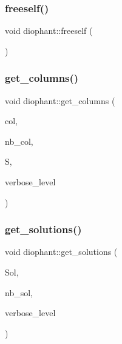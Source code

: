 \mbox{\label{classdiophant_a824e8dadc8420254d9e91f54e7e0ff5d}} 
\subsubsection{\texorpdfstring{freeself()}{freeself()}}
{\footnotesize\ttfamily void diophant\+::freeself (\begin{DoxyParamCaption}{ }\end{DoxyParamCaption})}

\mbox{\label{classdiophant_a394c08d30cf6df92f3d79ef52d0cff08}} 
\subsubsection{\texorpdfstring{get\+\_\+columns()}{get\_columns()}}
{\footnotesize\ttfamily void diophant\+::get\+\_\+columns (\begin{DoxyParamCaption}\item[{\mbox{\hyperlink{galois_8h_a09fddde158a3a20bd2dcadb609de11dc}{I\+NT}} $\ast$}]{col,  }\item[{\mbox{\hyperlink{galois_8h_a09fddde158a3a20bd2dcadb609de11dc}{I\+NT}}}]{nb\+\_\+col,  }\item[{\mbox{\hyperlink{classset__of__sets}{set\+\_\+of\+\_\+sets}} $\ast$\&}]{S,  }\item[{\mbox{\hyperlink{galois_8h_a09fddde158a3a20bd2dcadb609de11dc}{I\+NT}}}]{verbose\+\_\+level }\end{DoxyParamCaption})}

\mbox{\label{classdiophant_a3a77d2ec2f596cbca5677dda567ca34b}} 
\subsubsection{\texorpdfstring{get\+\_\+solutions()}{get\_solutions()}}
{\footnotesize\ttfamily void diophant\+::get\+\_\+solutions (\begin{DoxyParamCaption}\item[{\mbox{\hyperlink{galois_8h_a09fddde158a3a20bd2dcadb609de11dc}{I\+NT}} $\ast$\&}]{Sol,  }\item[{\mbox{\hyperlink{galois_8h_a09fddde158a3a20bd2dcadb609de11dc}{I\+NT}} \&}]{nb\+\_\+sol,  }\item[{\mbox{\hyperlink{galois_8h_a09fddde158a3a20bd2dcadb609de11dc}{I\+NT}}}]{verbose\+\_\+level }\end{DoxyParamCaption})}

